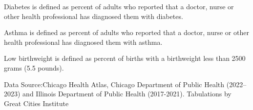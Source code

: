 \documentclass[
]{article}
\begin{document}
\begin{table}[H]
\begin{threeparttable}
\begin{tablenotes}
\item [] \footnotesize{Diabetes is defined as percent of adults who reported that a doctor, nurse or other health professional has diagnosed them with diabetes.}
\item [] \footnotesize{Asthma is defined as percent of adults who reported that a doctor, nurse or other health professional has diagnosed them with asthma.}
\item [] \footnotesize{Low birthweight is defined as percent of births with a birthweight less than 2500 grams (5.5 pounds).}
\item [] \footnotesize{Data Source:Chicago Health Atlas, Chicago Department of Public Health (2022–2023) and Illinois Department of Public Health (2017-2021). Tabulations by Great Cities Institute}
\end{tablenotes}
\end{threeparttable}
\end{table}
\end{document}
